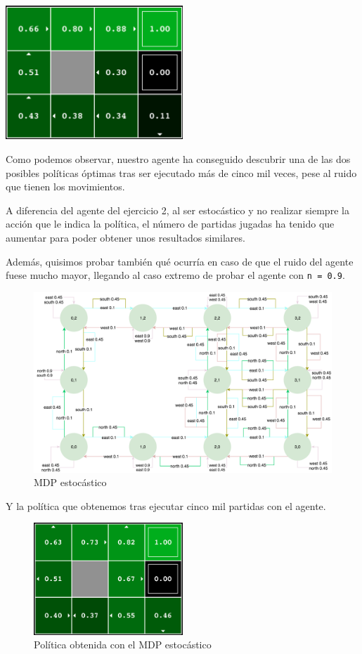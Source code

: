 \documentclass[12pt]{article}
\begin{document}
\centering
\includegraphics[width=0.5\textwidth]{policy_stochastic03}
\newline

Como podemos observar, nuestro agente ha conseguido descubrir una de las dos posibles políticas óptimas tras ser ejecutado más de cinco mil veces, pese al ruido que tienen los movimientos.

A diferencia del agente del ejercicio 2, al ser estocástico y no realizar siempre la acción que le indica la política, el número de partidas jugadas ha tenido que aumentar para poder obtener unos resultados similares.

Además, quisimos probar también qué ocurría en caso de que el ruido del agente fuese mucho mayor, llegando al caso extremo de probar el agente con \texttt{n = 0.9}.

\begin{figure}[htbp]
  \centering
    \includegraphics[width=\textwidth]{MDP_stochastic_09}
    \caption{MDP estocástico}
\end{figure}

Y la política que obtenemos tras ejecutar cinco mil partidas con el agente.

\begin{figure}[htpb]
    \centering
    \includegraphics[width=0.5\textwidth]{policy_stochastic09}
    \caption{Política obtenida con el MDP estocástico}
\end{figure}
\end{document}
